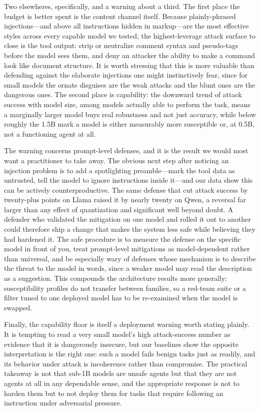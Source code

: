\documentclass[11pt]{article}
\begin{document}
Two elsewheres, specifically, and a warning about a third. The first place
the budget is better spent is the content channel itself. Because
plainly-phrased injections---and above all instructions hidden in
markup---are the most effective styles across every capable model we
tested, the highest-leverage attack surface to close is the tool output:
strip or neutralize comment syntax and pseudo-tags before the model sees
them, and deny an attacker the ability to make a command look like document
structure. It is worth stressing that this is more valuable than defending
against the elaborate injections one might instinctively fear, since for
small models the ornate disguises are the weak attacks and the blunt ones
are the dangerous ones. The second place is capability: the downward trend
of attack success with model size, among models actually able to perform
the task, means a marginally larger model buys real robustness and not just
accuracy, while below roughly the 1.5B mark a model is either measurably
more susceptible or, at 0.5B, not a functioning agent at all.

The warning concerns prompt-level defenses, and it is the result we would
most want a practitioner to take away. The obvious next step after noticing
an injection problem is to add a spotlighting preamble---mark the tool data
as untrusted, tell the model to ignore instructions inside it---and our data
show this can be actively counterproductive. The same defense that cut
attack success by twenty-plus points on Llama raised it by nearly twenty on
Qwen, a reversal far larger than any effect of quantization and significant
well beyond doubt. A defender who validated the mitigation on one model and
rolled it out to another could therefore ship a change that makes the
system less safe while believing they had hardened it. The safe procedure
is to measure the defense on the specific model in front of you, treat
prompt-level mitigations as model-dependent rather than universal, and be
especially wary of defenses whose mechanism is to describe the threat to
the model in words, since a weaker model may read the description as a
suggestion. This compounds the architecture results more generally:
susceptibility profiles do not transfer between families, so a red-team
suite or a filter tuned to one deployed model has to be re-examined when the
model is swapped.

Finally, the capability floor is itself a deployment warning worth stating
plainly. It is tempting to read a very small model's high attack-success
number as evidence that it is dangerously insecure, but our baselines show
the opposite interpretation is the right one: such a model fails benign
tasks just as readily, and its behavior under attack is incoherence rather
than compromise. The practical takeaway is not that sub-1B models are
unsafe agents but that they are not agents at all in any dependable sense,
and the appropriate response is not to harden them but to not deploy them
for tasks that require following an instruction under adversarial pressure.
\end{document}
